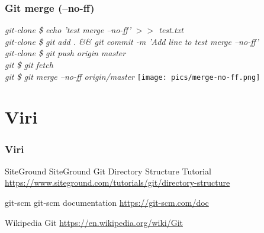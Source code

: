 \documentclass{beamer}
\begin{document}
\begin{frame}[shrink=20]
  \frametitle{Git merge (--no-ff)}
  \emph{git-clone \$ echo 'test merge --no-ff' $>>$ test.txt}\\
  \emph{git-clone \$ git add . \&\& git commit -m 'Add line to test merge --no-ff'}\\
  \emph{git-clone \$ git push origin master}\\
  \emph{git \$ git fetch}\\
  \emph{git \$ git merge --no-ff origin/master}
  \newline
  \texttt{[image: pics/merge-no-ff.png]}
\end{frame}

\section{Viri}

\begin{frame}
\frametitle{Viri}
\footnotesize{
\begin{thebibliography}{99} %
   SiteGround
    \newblock SiteGround Git Directory Structure Tutorial
    \newblock \url{https://www.siteground.com/tutorials/git/directory-structure}
    \newblock [Dostopano: 30.12.2017]

   git-scm
    \newblock git-scm documentation
    \newblock \url{https://git-scm.com/doc}
    \newblock [Dostopano: 30.12.2017]

   Wikipedia
    \newblock Git
    \newblock \url{https://en.wikipedia.org/wiki/Git}
    \newblock [Dostopano: 30.12.2017]
\end{thebibliography}
}
\end{frame}


\end{document}
